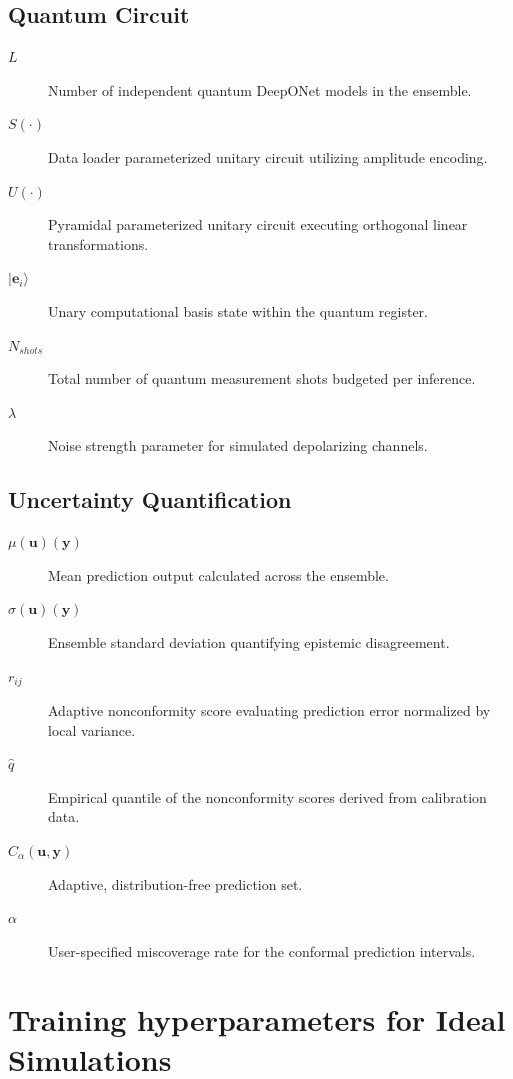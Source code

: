 \documentclass{iopjournal}
\begin{document}
\subsection*{Quantum Circuit}
\begin{description}
    \item[$L$] Number of independent quantum DeepONet models in the ensemble.
    \item[$S(\cdot)$] Data loader parameterized unitary circuit utilizing amplitude encoding.
    \item[$U(\cdot)$] Pyramidal parameterized unitary circuit executing orthogonal linear transformations.
    \item[$|\mathbf{e}_i\rangle$] Unary computational basis state within the quantum register.
    \item[$N_{shots}$] Total number of quantum measurement shots budgeted per inference.
    \item[$\lambda$] Noise strength parameter for simulated depolarizing channels.
\end{description}

\subsection*{Uncertainty Quantification}
\begin{description}
    \item[$\mu(\mathbf{u})(\mathbf{y})$] Mean prediction output calculated across the ensemble.
    \item[$\sigma(\mathbf{u})(\mathbf{y})$] Ensemble standard deviation quantifying epistemic disagreement.
    \item[$r_{ij}$] Adaptive nonconformity score evaluating prediction error normalized by local variance.
    \item[$\hat{q}$] Empirical quantile of the nonconformity scores derived from calibration data.
    \item[$C_\alpha(\mathbf{u}, \mathbf{y})$] Adaptive, distribution-free prediction set.
    \item[$\alpha$] User-specified miscoverage rate for the conformal prediction intervals.
\end{description}


\newpage
\section{Training hyperparameters for Ideal Simulations}\label{sec:train_hp}
\end{document}
